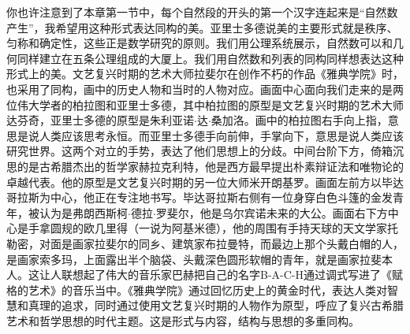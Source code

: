 \documentclass[UTF8]{article}
\begin{document}
你也许注意到了本章第一节中，每个自然段的开头的第一个汉字连起来是“自然数产生”，我希望用这种形式表达同构的美。亚里士多德说美的主要形式就是秩序、匀称和确定性，这些正是数学研究的原则。我们用公理系统展示，自然数可以和几何同样建立在五条公理组成的大厦上。我们用自然数和列表的同构同样想表达这种形式上的美。文艺复兴时期的艺术大师拉斐尔在创作不朽的作品《雅典学院》时，也采用了同构，画中的历史人物和当时的人物对应。画面中心面向我们走来的是两位伟大学者的柏拉图和亚里士多德，其中柏拉图的原型是文艺复兴时期的艺术大师达芬奇，亚里士多德的原型是朱利亚诺$\cdot$达$\cdot$桑加洛。画中的柏拉图右手向上指，意思是说人类应该思考永恒。而亚里士多德手向前伸，手掌向下，意思是说人类应该研究世界。这两个对立的手势，表达了他们思想上的分歧。中间台阶下方，倚箱沉思的是古希腊杰出的哲学家赫拉克利特，他是西方最早提出朴素辩证法和唯物论的卓越代表。他的原型是文艺复兴时期的另一位大师米开朗基罗。画面左前方以毕达哥拉斯为中心，他正在专注地书写。毕达哥拉斯右侧有一位身穿白色斗篷的金发青年，被认为是弗朗西斯柯$\cdot$德拉$\cdot$罗斐尔，他是乌尔宾诺未来的大公。画面右下方中心是手拿圆规的欧几里得（一说为阿基米德），他的周围有手持天球的天文学家托勒密，对面是画家拉斐尔的同乡、建筑家布拉曼特，而最边上那个头戴白帽的人，是画家索多玛，上面露出半个脑袋、头戴深色圆形软帽的青年，就是画家拉斐本人。这让人联想起了伟大的音乐家巴赫把自己的名字B-A-C-H通过调式写进了《赋格的艺术》的音乐当中。《雅典学院》通过回忆历史上的黄金时代，表达人类对智慧和真理的追求，同时通过使用文艺复兴时期的人物作为原型，呼应了复兴古希腊艺术和哲学思想的时代主题。这是形式与内容，结构与思想的多重同构。

\begin{Exercise}
\end{Exercise}
\end{document}
